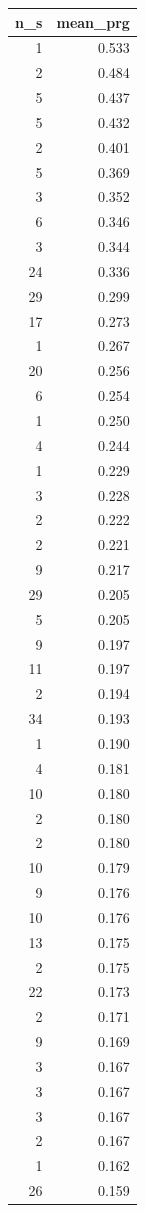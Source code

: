 \begin{tabular}{rr}
\toprule
n_s & mean_prg \\
\midrule
1 & 0.533 \\
2 & 0.484 \\
5 & 0.437 \\
5 & 0.432 \\
2 & 0.401 \\
5 & 0.369 \\
3 & 0.352 \\
6 & 0.346 \\
3 & 0.344 \\
24 & 0.336 \\
29 & 0.299 \\
17 & 0.273 \\
1 & 0.267 \\
20 & 0.256 \\
6 & 0.254 \\
1 & 0.250 \\
4 & 0.244 \\
1 & 0.229 \\
3 & 0.228 \\
2 & 0.222 \\
2 & 0.221 \\
9 & 0.217 \\
29 & 0.205 \\
5 & 0.205 \\
9 & 0.197 \\
11 & 0.197 \\
2 & 0.194 \\
34 & 0.193 \\
1 & 0.190 \\
4 & 0.181 \\
10 & 0.180 \\
2 & 0.180 \\
2 & 0.180 \\
10 & 0.179 \\
9 & 0.176 \\
10 & 0.176 \\
13 & 0.175 \\
2 & 0.175 \\
22 & 0.173 \\
2 & 0.171 \\
9 & 0.169 \\
3 & 0.167 \\
3 & 0.167 \\
3 & 0.167 \\
2 & 0.167 \\
1 & 0.162 \\
26 & 0.159 \\

\end{tabular}
